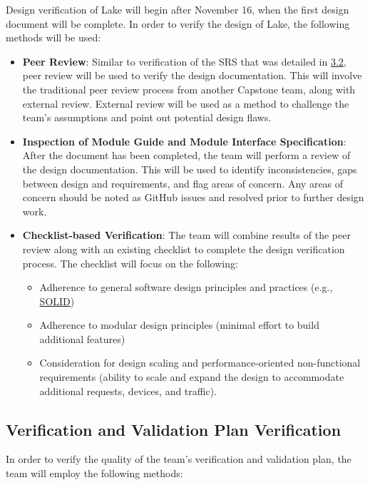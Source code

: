 \documentclass[12pt, titlepage]{article}
\begin{document}
Design verification of Lake will begin after November 16, when the first design document will be complete. In order to verify the design of Lake, the following methods will be used:

\begin{itemize}
  \item \textbf{Peer Review}: Similar to verification of the SRS that was detailed in \hyperref[sec:SRSVer]{3.2}, peer review will be used to verify the design documentation.
  This will involve the traditional peer review process from another Capstone team, along with external review. External review will be used as a method to challenge the team's assumptions
  and point out potential design flaws.
  \item \textbf{Inspection of Module Guide and Module Interface Specification}: After the document has been completed, the team will perform a review of the design documentation.
  This will be used to identify inconsistencies, gaps between design and requirements, and flag areas of concern. Any areas of concern should be noted as GitHub issues and resolved prior to further design work.
  \item \textbf{Checklist-based Verification}: The team will combine results of the peer review along with an existing checklist to complete the design verification process. The checklist will focus on the following:
    \begin{itemize}
      \item Adherence to general software design principles and practices (e.g., \hyperref[SOLID]{SOLID})
      \item Adherence to modular design principles (minimal effort to build additional features)
      \item Consideration for design scaling and performance-oriented non-functional requirements (ability to scale and expand the design to accommodate additional requests, devices, and traffic).
    \end{itemize}
\end{itemize}


\subsection{Verification and Validation Plan Verification}
\label{sec:VnVVer}

In order to verify the quality of the team's verification and validation plan, the team will employ the following methods:
\end{document}
